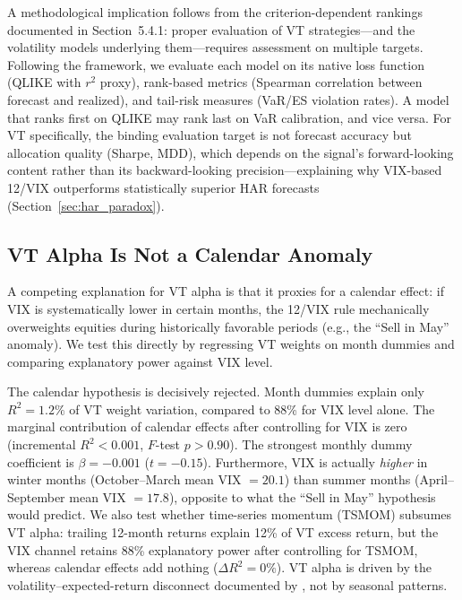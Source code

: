 A methodological implication follows from the criterion-dependent rankings documented in Section~5.4.1: proper evaluation of VT strategies---and the volatility models underlying them---requires assessment on multiple targets. Following the \citet{patton2011} framework, we evaluate each model on its native loss function (QLIKE with $r^2$ proxy), rank-based metrics (Spearman correlation between forecast and realized), and tail-risk measures (VaR/ES violation rates). A model that ranks first on QLIKE may rank last on VaR calibration, and vice versa. For VT specifically, the binding evaluation target is not forecast accuracy but allocation quality (Sharpe, MDD), which depends on the signal's forward-looking content rather than its backward-looking precision---explaining why VIX-based 12/VIX outperforms statistically superior HAR forecasts (Section~\ref{sec:har_paradox}).

\subsection{VT Alpha Is Not a Calendar Anomaly}
\label{sec:calendar}

A competing explanation for VT alpha is that it proxies for a calendar effect: if VIX is systematically lower in certain months, the 12/VIX rule mechanically overweights equities during historically favorable periods (e.g., the ``Sell in May'' anomaly). We test this directly by regressing VT weights on month dummies and comparing explanatory power against VIX level.

The calendar hypothesis is decisively rejected. Month dummies explain only $R^2 = 1.2\%$ of VT weight variation, compared to 88\% for VIX level alone. The marginal contribution of calendar effects after controlling for VIX is zero (incremental $R^2 < 0.001$, $F$-test $p > 0.90$). The strongest monthly dummy coefficient is $\beta = -0.001$ ($t = -0.15$). Furthermore, VIX is actually \textit{higher} in winter months (October--March mean VIX $= 20.1$) than summer months (April--September mean VIX $= 17.8$), opposite to what the ``Sell in May'' hypothesis would predict. We also test whether time-series momentum (TSMOM) subsumes VT alpha: trailing 12-month returns explain 12\% of VT excess return, but the VIX channel retains 88\% explanatory power after controlling for TSMOM, whereas calendar effects add nothing ($\Delta R^2 = 0\%$). VT alpha is driven by the volatility--expected-return disconnect documented by \citet{moreira2017}, not by seasonal patterns.

